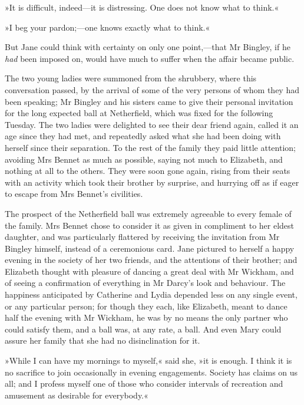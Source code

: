 »It is difficult, indeed—it is distressing. One does not know what to think.«

»I beg your pardon;—one knows exactly what to think.«

But Jane could think with certainty on only one point,—that Mr Bingley, if he \textit{had} been imposed on, would have much to suffer when the affair became public.

The two young ladies were summoned from the shrubbery, where this conversation passed, by the arrival of some of the very persons of whom they had been speaking; Mr Bingley and his sisters came to give their personal invitation for the long expected ball at Netherfield, which was fixed for the following Tuesday. The two ladies were delighted to see their dear friend again, called it an age since they had met, and repeatedly asked what she had been doing with herself since their separation. To the rest of the family they paid little attention; avoiding Mrs Bennet as much as possible, saying not much to Elizabeth, and nothing at all to the others. They were soon gone again, rising from their seats with an activity which took their brother by surprise, and hurrying off as if eager to escape from Mrs Bennet's civilities.



The prospect of the Netherfield ball was extremely agreeable to every female of the family. Mrs Bennet chose to consider it as given in compliment to her eldest daughter, and was particularly flattered by receiving the invitation from Mr Bingley himself, instead of a ceremonious card. Jane pictured to herself a happy evening in the society of her two friends, and the attentions of their brother; and Elizabeth thought with pleasure of dancing a great deal with Mr Wickham, and of seeing a confirmation of everything in Mr Darcy's look and behaviour. The happiness anticipated by Catherine and Lydia depended less on any single event, or any particular person; for though they each, like Elizabeth, meant to dance half the evening with Mr Wickham, he was by no means the only partner who could satisfy them, and a ball was, at any rate, a ball. And even Mary could assure her family that she had no disinclination for it.

»While I can have my mornings to myself,« said she, »it is enough. I think it is no sacrifice to join occasionally in evening engagements. Society has claims on us all; and I profess myself one of those who consider intervals of recreation and amusement as desirable for everybody.«


